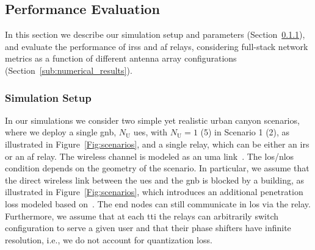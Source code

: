 

\subsection{Performance Evaluation}
\label{sec:results}

In this section we describe our simulation setup and parameters (Section~\ref{sub:simulation_setup}), and evaluate the performance of \glspl{irs} and \gls{af} relays, considering full-stack network metrics as a function of different antenna array configurations (Section~\ref{sub:numerical_results}).

\subsubsection{Simulation Setup} %
\label{sub:simulation_setup}

In our simulations we consider two simple yet realistic urban canyon scenarios, where we deploy a single \gls{gnb}, $N_{\mathrm U}$ \glspl{ue}, with $N_{\mathrm U}=1$ (5) in Scenario 1 (2), as illustrated in Figure~\ref{Fig:scenarios}, and a single relay, which can be either an \gls{irs} or an \gls{af} relay.
The wireless channel is modeled as an \gls{uma} link~\cite{3gpp.38.901}. %
The \gls{los}/\gls{nlos} condition depends on the geometry of the scenario.
In particular, we assume that the direct wireless link between the \glspl{ue} and the \gls{gnb} is blocked by a building, as illustrated in Figure~\ref{Fig:scenarios}, which introduces an additional penetration loss modeled based on~\cite[Section 7.4.3.1]{3gpp.38.901}.
The end nodes can still communicate in \gls{los} via the relay. 
Furthermore, we assume that at each \gls{tti} the relays can arbitrarily switch configuration to serve a given user and that their phase shifters have infinite resolution, i.e., we do not account for quantization loss.
 
